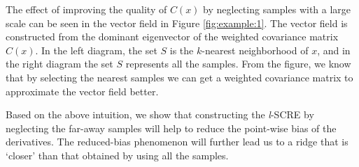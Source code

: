 \documentclass[aos,preprint]{imsart}
\theoremstyle{remark}
\begin{document}
The effect of improving the quality of $C(x)$ by neglecting samples with a large scale can be seen in the vector field in Figure \ref{fig:example:1}. The vector field is constructed from the dominant eigenvector of the weighted covariance matrix $C(x)$. In the left diagram, the set $S$ is the $k$-nearest neighborhood of $x$, and in the right diagram the set $S$ represents all the samples. From the figure, we know that by selecting the nearest samples we can get a weighted covariance matrix to approximate the vector field better.

Based on the above intuition, we show that constructing the {\it l}-SCRE by neglecting the far-away samples will help to reduce the point-wise bias of the derivatives. The reduced-bias phenomenon will further lead us to a ridge that is `closer' than that obtained by using all the samples.
\end{document}

